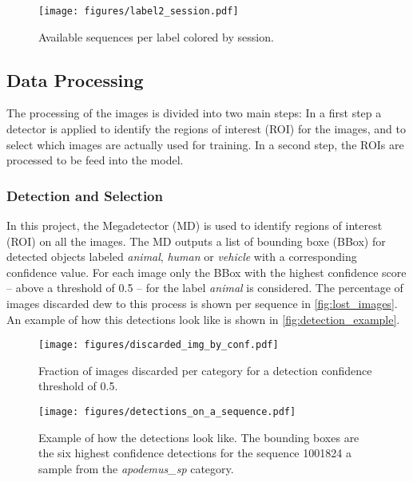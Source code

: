     \begin{figure}[ht]
    \centering
    \texttt{[image: figures/label2\_session.pdf]}
    \caption{Available sequences per label colored by session.}
    \label{fig:sequenceperlabel}
    \end{figure}

    \subsection{Data Processing}

    The processing of the images is divided into two main steps: 
    In a first step a detector is applied to identify the regions of interest (ROI) for the images, and to select which images are actually used for training.
    In a second step, the ROIs are processed to be feed into the model.

        \subsubsection{Detection and Selection}
        
        In this project, the Megadetector (MD) \autocite{morrisEfficientPipelineCamera2025} is used to identify regions of interest (ROI) on all the images.
        The MD outputs a list of bounding boxe (BBox) for detected objects labeled \textit{animal}, \textit{human} or \textit{vehicle} with a corresponding confidence value.
        For each image only the BBox with the highest confidence score -- above a threshold of 0.5 -- for the label \textit{animal} is considered.
        The percentage of images discarded dew to this process is  shown per sequence in \autoref{fig:lost_images}.
        An example of how this detections look like is shown in \autoref{fig:detection_example}.

        \begin{figure}[ht]
        \centering
        \texttt{[image: figures/discarded\_img\_by\_conf.pdf]}
        \caption{Fraction of images discarded per category for a detection confidence threshold of 0.5.}
        \label{fig:lost_images}
        \end{figure}

        \begin{figure}[ht]
        \centering
        \texttt{[image: figures/detections\_on\_a\_sequence.pdf]}
        \caption{Example of how the detections look like. The bounding boxes are the six highest confidence detections for the sequence 1001824 a sample from the \textit{apodemus\_sp} category.}
        \label{fig:detection_example}
        \end{figure}

